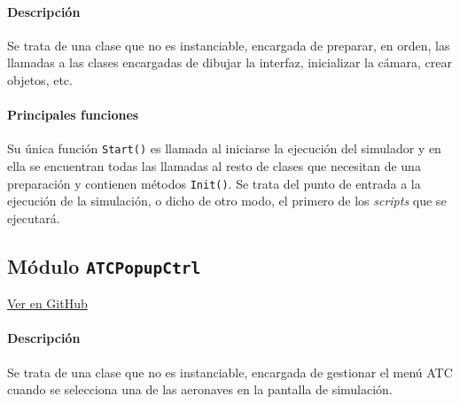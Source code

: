 \paragraph{Descripción} \phantom{\newline}

Se trata de una clase que no es instanciable, encargada de preparar, en orden, las llamadas a las clases encargadas de dibujar la interfaz, inicializar la cámara, crear objetos, etc.

\paragraph{Principales funciones} \phantom{\newline}

Su única función \texttt{Start()} es llamada al iniciarse la ejecución del simulador y en ella se encuentran todas las llamadas al resto de clases que necesitan de una preparación y contienen métodos \texttt{Init()}. Se trata del punto de entrada a la ejecución de la simulación, o dicho de otro modo, el primero de los \textit{scripts} que se ejecutará.







\subsection{Módulo \texttt{ATCPopupCtrl}}
\label{subsec:ClaseATCPopupCtrl}

\vspace{-0.85cm}
\begin{flushright}
\href{https://github.com/macgyver912/atc-simulator/blob/jaime/Assets/Scripts/graphics/ATCPopupCtrl.cs}{Ver en GitHub \faGithub}
\end{flushright}

\paragraph{Descripción} \phantom{\newline}

Se trata de una clase que no es instanciable, encargada de gestionar el menú ATC cuando se selecciona una de las aeronaves en la pantalla de simulación.

